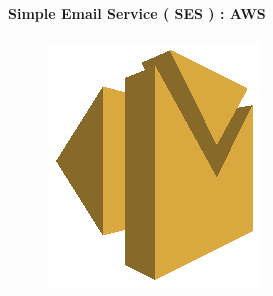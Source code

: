 \documentclass[
12pt,
english,
ngerman,
headsepline,
twoside,
openright,
numbers=noenddot,version=first
]{scrreprt}
\begin{document}
\paragraph{Simple Email Service ( SES ) : AWS }
\begin{figure}
	\includegraphics[width=0.9\linewidth]{./pics/aws/Messaging_AmazonSES.eps}
\end{figure}
\end{document}
